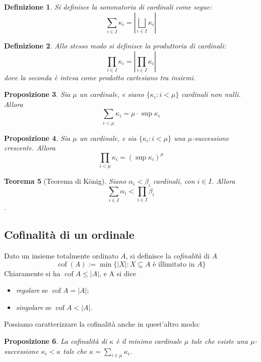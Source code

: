 \documentclass[a4paper,10pt,oneside]{article}
\DeclareMathOperator{\cof}{cof}
\newcommand{\myname}[1]{\emph{#1}}
\theoremstyle{plain}
\newtheorem{mytheorem}{Teorema}[section]
\newtheorem{mydef}[mytheorem]{Definizione}
\newtheorem{myprop}[mytheorem]{Proposizione}
\theoremstyle{definition}
\theoremstyle{remark}
\begin{document}
\begin{mydef}
 Si definisce la sommatoria di cardinali come segue:
 \[\sum_{i\in I}\kappa_i = \left|\bigsqcup_{i\in I}\kappa_i\right|\]
\end{mydef}

\begin{mydef}
 Allo stesso modo si definisce la produttoria di cardinali:
 \[\prod_{i\in I}\kappa_i = \left|\prod_{i\in I}\kappa_i\right|\]
 dove la seconda è intesa come prodotto cartesiano tra insiemi.
\end{mydef}


\begin{myprop}
 Sia $\mu$ un cardinale, e siano $\{\kappa_i:i<\mu\}$ cardinali non nulli. Allora \[\sum_{i< \mu} \kappa_i = \mu\cdot \sup \kappa_i\]
\end{myprop}
\begin{myprop}
 Sia $\mu$ un cardinale, e sia $\{\kappa_i:i<\mu\}$ una $\mu$-successione crescente. Allora \[\prod_{i<\mu}\kappa_i=(\sup \kappa_i)^{\mu}\]
\end{myprop}

\begin{mytheorem}[Teorema di K\"onig]
  Siano $\alpha_i<\beta_i$ cardinali, con $i\in I$. Allora \[\sum_{i\in I} \alpha_i < \prod_{i\in I} \beta_i\].
\end{mytheorem}


\subsection{Cofinalità di un ordinale}

Dato un insieme totalmente ordinato $A$, si definisce la \myname{cofinalità} di $A$
\[ \cof(A) := \min\{|X|:X\subseteq A \textrm{ è illimitato in }A\}\]  
Chiaramente si ha $\cof A \le |A|$, e A si dice
\begin{itemize}
 \item \myname{regolare} se $\cof A=|A|$;
 \item \myname{singolare} se $\cof A<|A|$.
\end{itemize}

Possiamo caratterizzare la cofinalità anche in quest'altro modo:
\begin{myprop}

 La cofinalità di $\kappa$ è il minimo cardinale $\mu$ tale che esiste una $\mu$-successione $\kappa_i<\kappa$ tale che $\kappa =\sum_{i\in \mu} \kappa_i$.
\end{myprop}
\end{document}
